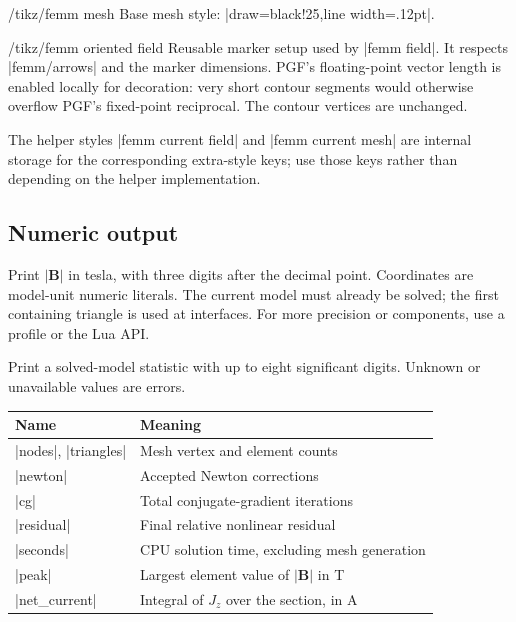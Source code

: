 \begin{stylekey}{/tikz/femm mesh}
Base mesh style: |draw=black!25,line width=.12pt|.
\end{stylekey}
\begin{key}{/tikz/femm oriented field}
Reusable marker setup used by |femm field|. It respects |femm/arrows|
and the marker dimensions. PGF's floating-point vector length is enabled
locally for decoration: very short contour segments would otherwise
overflow PGF's fixed-point reciprocal. The contour vertices are unchanged.
\end{key}
The helper styles |femm current field| and |femm current mesh| are internal
storage for the corresponding extra-style keys; use those keys rather
than depending on the helper implementation.

\subsection{Numeric output}
\begin{command}{\femmB{}}
Print $|\mathbf B|$ in tesla, with three digits after the decimal point.
Coordinates are model-unit numeric literals. The current model must
already be solved; the first containing triangle is used at interfaces.
For more precision or components, use a profile or the Lua API.
\end{command}
\begin{command}{\femmstat{}}
Print a solved-model statistic with up to eight significant digits.
Unknown or unavailable values are errors.
\end{command}
\begin{center}
\begin{tabular}{ll}
\toprule Name & Meaning \\
\midrule
|nodes|, |triangles| & Mesh vertex and element counts \\
|newton| & Accepted Newton corrections \\
|cg| & Total conjugate-gradient iterations \\
|residual| & Final relative nonlinear residual \\
|seconds| & CPU solution time, excluding mesh generation \\
|peak| & Largest element value of $|\mathbf B|$ in T \\
|net_current| & Integral of $J_z$ over the section, in A \\
\bottomrule
\end{tabular}
\end{center}
